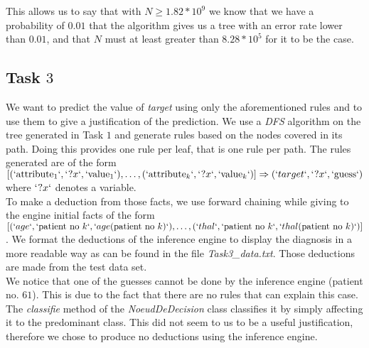\documentclass[9pt]{extarticle}
\begin{document}
	
	

	

This allows us to say that with $N\geq1.82*10^9$ we know that we have a probability of $0.01$ that the algorithm gives us a tree with an error rate lower than $0.01$, and that $N$ must at least greater than $8.28*10^5$ for it to be the case.

\subsection{Task $3$}
	We want to predict the value of \emph{target} using only the aforementioned rules and to use them to give a justification of the prediction.
	We use a \emph{DFS} algorithm on the tree generated in Task $1$ and generate rules based on the nodes covered in its path. Doing this provides one rule per leaf, that is one rule per path. The rules generated are of the form $ [(`\mathrm{attribute}_1`,` ?x`, `\mathrm{value}_1`),\ldots,(`\mathrm{attribute}_k`,` ?x`, `\mathrm{value}_k`)]\Rightarrow(`target`, `?x` , `\mathrm{guess}`)$ where $`?x`$ denotes a variable.\\
	To make a deduction from those facts, we use forward chaining while giving to the engine initial facts of the form $[(`age`, `\mathrm{patient\ no}\ k`, `age(\mathrm{patient\ no}\ k)`),\ldots,(`thal`, `\mathrm{patient\ no}\ k`, `thal(\mathrm{patient\ no}\ k)`)]$. We format the deductions of the inference engine to display the diagnosis in a more readable way as can be found in the file \emph{Task3\_data.txt}. Those deductions are made from the test data set.\\
	We notice that one of the guesses cannot be done by the inference engine (patient no. $61$). This is due to the fact that there are no rules that can explain this case. The \emph{classifie} method of the \emph{NoeudDeDecision} class classifies it by simply affecting it to the predominant class. This did not seem to us to be a useful justification, therefore we chose to produce no deductions using the inference engine.
	
\end{document}
